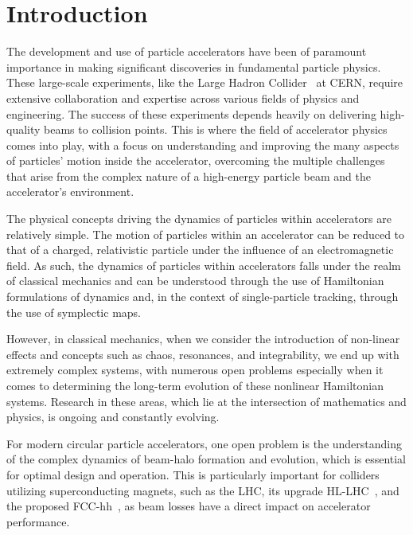 


\chapter*{Introduction}

The development and use of particle accelerators have been of paramount importance in making significant discoveries in fundamental particle physics. These large-scale experiments, like the Large Hadron Collider~\cite{Benedikt:823808} at CERN, require extensive collaboration and expertise across various fields of physics and engineering. The success of these experiments depends heavily on delivering high-quality beams to collision points. This is where the field of accelerator physics comes into play, with a focus on understanding and improving the many aspects of particles' motion inside the accelerator, overcoming the multiple challenges that arise from the complex nature of a high-energy particle beam and the accelerator's environment.

The physical concepts driving the dynamics of particles within accelerators are relatively simple. The motion of particles within an accelerator can be reduced to that of a charged, relativistic particle under the influence of an electromagnetic field. As such, the dynamics of particles within accelerators falls under the realm of classical mechanics and can be understood through the use of Hamiltonian formulations of dynamics and, in the context of single-particle tracking, through the use of symplectic maps.

However, in classical mechanics, when we consider the introduction of non-linear effects and concepts such as chaos, resonances, and integrability, we end up with extremely complex systems, with numerous open problems especially when it comes to determining the long-term evolution of these nonlinear Hamiltonian systems. Research in these areas, which lie at the intersection of mathematics and physics, is ongoing and constantly evolving.

For modern circular particle accelerators, one open problem is the understanding of the complex dynamics of beam-halo formation and evolution, which is essential for optimal design and operation. This is particularly important for colliders utilizing superconducting magnets, such as the LHC, its upgrade HL-LHC~\cite{BejarAlonso:2749422}, and the proposed FCC-hh~\cite{Benedikt:2651300}, as beam losses have a direct impact on accelerator performance.


